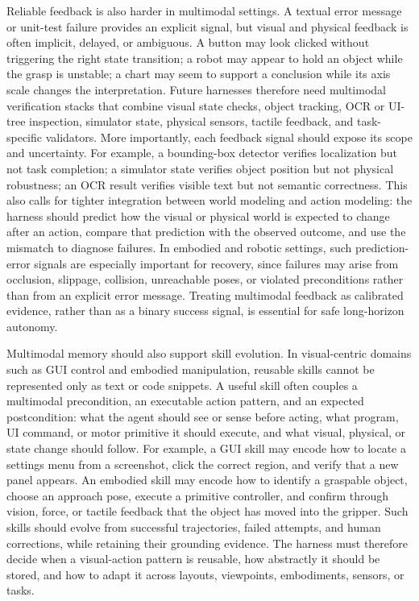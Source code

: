 Reliable feedback is also harder in multimodal settings. A textual error message or unit-test failure provides an explicit signal, but visual and physical feedback is often implicit, delayed, or ambiguous. A button may look clicked without triggering the right state transition; a robot may appear to hold an object while the grasp is unstable; a chart may seem to support a conclusion while its axis scale changes the interpretation. Future harnesses therefore need multimodal verification stacks that combine visual state checks, object tracking, OCR or UI-tree inspection, simulator state, physical sensors, tactile feedback, and task-specific validators. More importantly, each feedback signal should expose its scope and uncertainty. For example, a bounding-box detector verifies localization but not task completion; a simulator state verifies object position but not physical robustness; an OCR result verifies visible text but not semantic correctness. This also calls for tighter integration between world modeling and action modeling: the harness should predict how the visual or physical world is expected to change after an action, compare that prediction with the observed outcome, and use the mismatch to diagnose failures. In embodied and robotic settings, such prediction-error signals are especially important for recovery, since failures may arise from occlusion, slippage, collision, unreachable poses, or violated preconditions rather than from an explicit error message. Treating multimodal feedback as calibrated evidence, rather than as a binary success signal, is essential for safe long-horizon autonomy.

Multimodal memory should also support skill evolution. In visual-centric domains such as GUI control and embodied manipulation, reusable skills cannot be represented only as text or code snippets. A useful skill often couples a multimodal precondition, an executable action pattern, and an expected postcondition: what the agent should see or sense before acting, what program, UI command, or motor primitive it should execute, and what visual, physical, or state change should follow. For example, a GUI skill may encode how to locate a settings menu from a screenshot, click the correct region, and verify that a new panel appears. An embodied skill may encode how to identify a graspable object, choose an approach pose, execute a primitive controller, and confirm through vision, force, or tactile feedback that the object has moved into the gripper. Such skills should evolve from successful trajectories, failed attempts, and human corrections, while retaining their grounding evidence. The harness must therefore decide when a visual-action pattern is reusable, how abstractly it should be stored, and how to adapt it across layouts, viewpoints, embodiments, sensors, or tasks.


